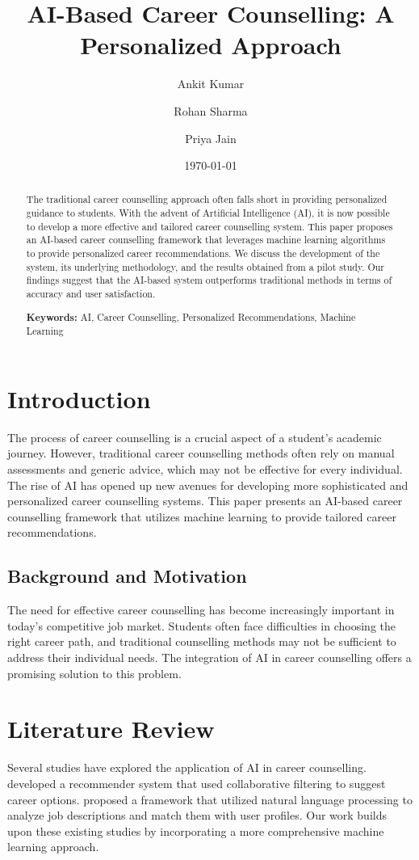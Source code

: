 \documentclass[12pt,a4paper]{article}
\title{AI-Based Career Counselling: A Personalized Approach}
\author{Ankit Kumar \and Rohan Sharma \and Priya Jain}
\date{\today}
\begin{document}
\maketitle
\thispagestyle{empty}

\begin{abstract}
The traditional career counselling approach often falls short in providing personalized guidance to students. With the advent of Artificial Intelligence (AI), it is now possible to develop a more effective and tailored career counselling system. This paper proposes an AI-based career counselling framework that leverages machine learning algorithms to provide personalized career recommendations. We discuss the development of the system, its underlying methodology, and the results obtained from a pilot study. Our findings suggest that the AI-based system outperforms traditional methods in terms of accuracy and user satisfaction.

\textbf{Keywords:} AI, Career Counselling, Personalized Recommendations, Machine Learning
\end{abstract}

\newpage
\tableofcontents
\newpage

\twocolumn
\section{Introduction}
The process of career counselling is a crucial aspect of a student's academic journey. However, traditional career counselling methods often rely on manual assessments and generic advice, which may not be effective for every individual. The rise of AI has opened up new avenues for developing more sophisticated and personalized career counselling systems. This paper presents an AI-based career counselling framework that utilizes machine learning to provide tailored career recommendations.

\subsection{Background and Motivation}
The need for effective career counselling has become increasingly important in today's competitive job market. Students often face difficulties in choosing the right career path, and traditional counselling methods may not be sufficient to address their individual needs. The integration of AI in career counselling offers a promising solution to this problem.

\section{Literature Review}
Several studies have explored the application of AI in career counselling. \citet{Lee2020} developed a recommender system that used collaborative filtering to suggest career options. \citet{Patel2019} proposed a framework that utilized natural language processing to analyze job descriptions and match them with user profiles. Our work builds upon these existing studies by incorporating a more comprehensive machine learning approach.
\end{document}
